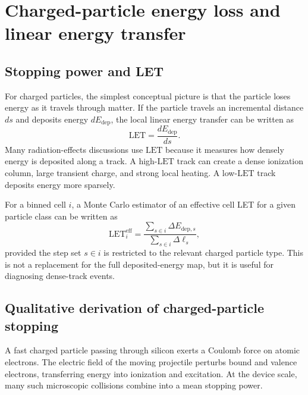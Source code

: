 \documentclass[11pt]{article}
\newcommand{\LET}{\mathrm{LET}}
\begin{document}
\section{Charged-particle energy loss and linear energy transfer}

\subsection{Stopping power and LET}

For charged particles, the simplest conceptual picture is that the particle loses energy as it travels through matter. If the particle travels an incremental distance $ds$ and deposits energy $dE_{\mathrm{dep}}$, the local linear energy transfer can be written as
\begin{equation}
\LET = \frac{dE_{\mathrm{dep}}}{ds}.
\label{eq:let_definition}
\end{equation}
Many radiation-effects discussions use $\LET$ because it measures how densely energy is deposited along a track. A high-$\LET$ track can create a dense ionization column, large transient charge, and strong local heating. A low-$\LET$ track deposits energy more sparsely.

For a binned cell $i$, a Monte Carlo estimator of an effective cell LET for a given particle class can be written as
\begin{equation}
\LET_i^{\mathrm{eff}}
=
\frac{\sum_{s\in i} \Delta E_{\mathrm{dep},s}}{\sum_{s\in i} \Delta \ell_s},
\label{eq:cell_let_estimator}
\end{equation}
provided the step set $s\in i$ is restricted to the relevant charged particle type. This is not a replacement for the full deposited-energy map, but it is useful for diagnosing dense-track events.

\subsection{Qualitative derivation of charged-particle stopping}

A fast charged particle passing through silicon exerts a Coulomb force on atomic electrons. The electric field of the moving projectile perturbs bound and valence electrons, transferring energy into ionization and excitation. At the device scale, many such microscopic collisions combine into a mean stopping power.
\end{document}
